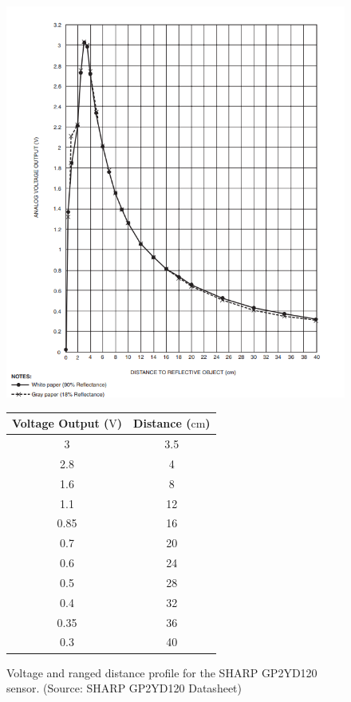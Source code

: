 \documentclass[a4paper]{article}
\begin{document}
\begin{figure}[h]
\centering
\begin{minipage}[c]{0.45\textwidth}
\centering
\includegraphics[scale=0.4]{GP2Y_short}
\caption{Voltage and ranged distance profile for the SHARP GP2YD120 sensor. (Source: SHARP GP2YD120 Datasheet)}
\end{minipage}
\hspace{1cm}
\begin{minipage}[c]{0.45\textwidth}
\centering
{}
\begin{tabular}{cc}
\toprule
\textbf{Voltage Output ($\si{\volt}$)} & \textbf{Distance ($\si{\centi\meter}$)}\\
\midrule
3 & 3.5\\
2.8 & 4\\
1.6 & 8\\
1.1 & 12\\
0.85 & 16\\
0.7 & 20\\
0.6 & 24\\
0.5 & 28\\
0.4 & 32\\
0.35 & 36\\
0.3 & 40\\
\bottomrule
\end{tabular}
\end{minipage}
\end{figure}
\end{document}
